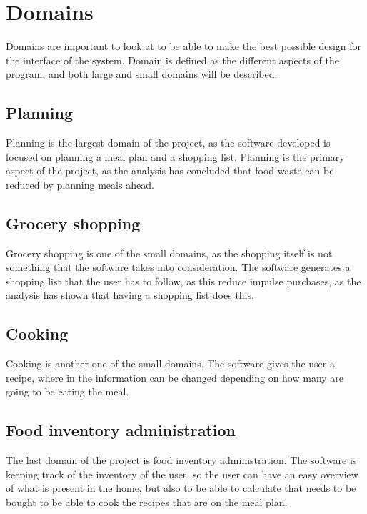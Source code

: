 \section{Domains}

Domains are important to look at to be able to make the best possible design for the interface of the system. Domain is defined as the different aspects of the program, and both large and small domains will be described.

\subsection{Planning}

Planning is the largest domain of the project, as the software developed is focused on planning a meal plan and a shopping list. Planning is the primary aspect of the project, as the analysis has concluded that food waste can be reduced by planning meals ahead.

\subsection{Grocery shopping}

Grocery shopping is one of the small domains, as the shopping itself is not something that the software takes into consideration. The software generates a shopping list that the user has to follow, as this reduce impulse purchases, as the analysis has shown that having a shopping list does this.

\subsection{Cooking}

Cooking is another one of the small domains. The software gives the user a recipe, where in the information can be changed depending on how many are going to be eating the meal.

\subsection{Food inventory administration}
 
The last domain of the project is food inventory administration. The software is keeping track of the inventory of the user, so the user can have an easy overview of what is present in the home, but also to be able to calculate that needs to be bought to be able to cook the recipes that are on the meal plan.